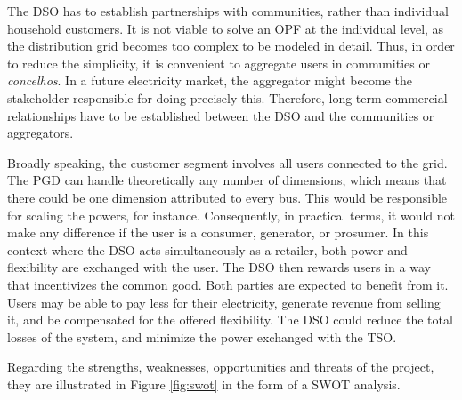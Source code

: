 The DSO has to establish partnerships with communities, rather than individual household customers. It is not viable to solve an OPF at the individual level, as the distribution grid becomes too complex to be modeled in detail. Thus, in order to reduce the simplicity, it is convenient to aggregate users in communities or \textit{concelhos}. In a future electricity market, the aggregator might become the stakeholder responsible for doing precisely this. Therefore, long-term commercial relationships have to be established between the DSO and the communities or aggregators.

Broadly speaking, the customer segment involves all users connected to the grid. The PGD can handle theoretically any number of dimensions, which means that there could be one dimension attributed to every bus. This would be responsible for scaling the powers, for instance. Consequently, in practical terms, it would not make any difference if the user is a consumer, generator, or prosumer. In this context where the DSO acts simultaneously as a retailer, both power and flexibility are exchanged with the user. The DSO then rewards users in a way that incentivizes the common good. Both parties are expected to benefit from it. Users may be able to pay less for their electricity, generate revenue from selling it, and be compensated for the offered flexibility. The DSO could reduce the total losses of the system, and minimize the power exchanged with the TSO. 

Regarding the strengths, weaknesses, opportunities and threats of the project, they are illustrated in Figure \ref{fig:swot} in the form of a SWOT analysis. 




